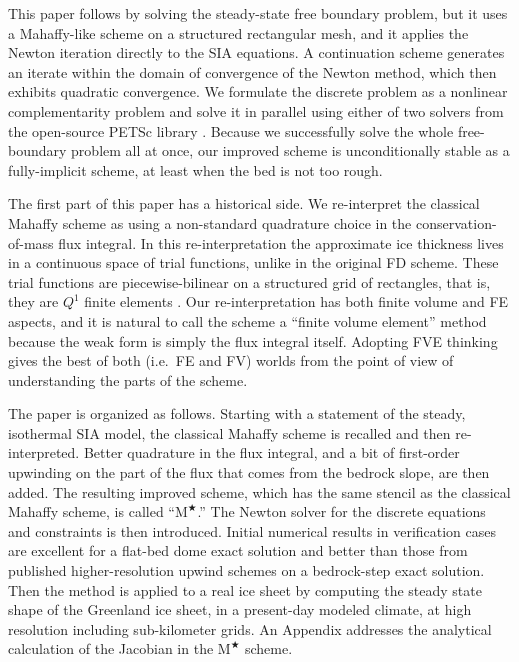 \documentclass[twocolumn,letterpaper]{igs}
\newcommand{\Mstar}{$\text{M}^{\bigstar}$\xspace}
\begin{document}
This paper follows \cite{JouvetBueler2012} by solving the steady-state free boundary problem, but it uses a Mahaffy-like scheme on a structured rectangular mesh, and it applies the Newton iteration directly to the SIA equations.  A continuation scheme generates an iterate within the domain of convergence of the Newton method, which then exhibits quadratic convergence.  We formulate the discrete problem as a nonlinear complementarity problem \citep{BensonMunson2006} and solve it in parallel using either of two solvers from the open-source PETSc library \citep{Balayetal2014}.  Because we successfully solve the whole free-boundary problem all at once, our improved scheme is unconditionally stable as a fully-implicit scheme, at least when the bed is not too rough.

The first part of this paper has a historical side.  We re-interpret the classical Mahaffy scheme as using a non-standard quadrature choice in the conservation-of-mass flux integral.  In this re-interpretation the approximate ice thickness lives in a continuous space of trial functions, unlike in the original FD scheme.  These trial functions are piecewise-bilinear on a structured grid of rectangles, that is, they are $Q^1$ finite elements \citep{Elmanetal2005}.  Our re-interpretation has both finite volume \citep[FV;][]{LeVeque2002} and FE aspects, and it is natural to call the scheme a ``finite volume element'' method \citep[FVE;][]{Cai1990,EwingLinLin2002} because the weak form is simply the flux integral itself.  Adopting FVE thinking gives the best of both (i.e.~FE and FV) worlds from the point of view of understanding the parts of the scheme.

The paper is organized as follows.  Starting with a statement of the steady, isothermal SIA model, the classical Mahaffy scheme is recalled and then re-interpreted.  Better quadrature in the flux integral, and a bit of first-order upwinding on the part of the flux that comes from the bedrock slope, are then added.  The resulting improved scheme, which has the same stencil as the classical Mahaffy scheme, is called ``\Mstar.''  The Newton solver for the discrete equations and constraints is then introduced.  Initial numerical results in verification cases are excellent for a flat-bed dome exact solution and better than those from published higher-resolution upwind schemes on a bedrock-step exact solution.  Then the method is applied to a real ice sheet by computing the steady state shape of the Greenland ice sheet, in a present-day modeled climate, at high resolution including sub-kilometer grids.  An Appendix addresses the analytical calculation of the Jacobian in the \Mstar scheme.
\end{document}
